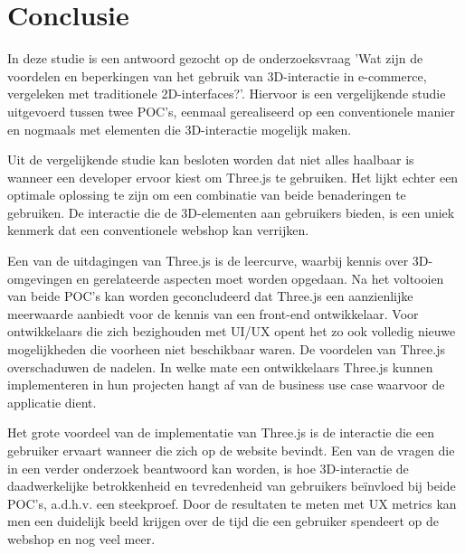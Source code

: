 
\chapter{Conclusie}%
\label{ch:conclusie}


In deze studie is een antwoord gezocht op de onderzoeksvraag 'Wat zijn de voordelen en beperkingen van het gebruik van 3D-interactie in e-commerce, vergeleken met traditionele 2D-interfaces?'. Hiervoor is een vergelijkende studie uitgevoerd tussen twee POC's, eenmaal gerealiseerd op een conventionele manier en nogmaals met elementen die 3D-interactie mogelijk maken.

Uit de vergelijkende studie kan besloten worden dat niet alles haalbaar is wanneer een developer ervoor kiest om Three.js te gebruiken. Het lijkt echter een optimale oplossing te zijn om een combinatie van beide benaderingen te gebruiken. De interactie die de 3D-elementen aan gebruikers bieden, is een uniek kenmerk dat een conventionele webshop kan verrijken.

Een van de uitdagingen van Three.js is de leercurve, waarbij kennis over 3D-omgevingen en gerelateerde aspecten moet worden opgedaan. Na het voltooien van beide POC's kan worden geconcludeerd dat Three.js een aanzienlijke meerwaarde aanbiedt voor de kennis van een front-end ontwikkelaar. Voor ontwikkelaars die zich bezighouden met UI/UX opent het zo ook volledig nieuwe mogelijkheden die voorheen niet beschikbaar waren. De voordelen van Three.js overschaduwen de nadelen. In welke mate een ontwikkelaars Three.js kunnen implementeren in hun projecten hangt af van de business use case waarvoor de applicatie dient.

Het grote voordeel van de implementatie van Three.js is de interactie die een gebruiker ervaart wanneer die zich op de website bevindt. Een van de vragen die in een verder onderzoek beantwoord kan worden, is hoe 3D-interactie de daadwerkelijke betrokkenheid en tevredenheid van gebruikers beïnvloed bij beide POC's, a.d.h.v. een steekproef. Door de resultaten te meten met UX metrics kan men een duidelijk beeld krijgen over de tijd die een gebruiker spendeert op de webshop en nog veel meer.
